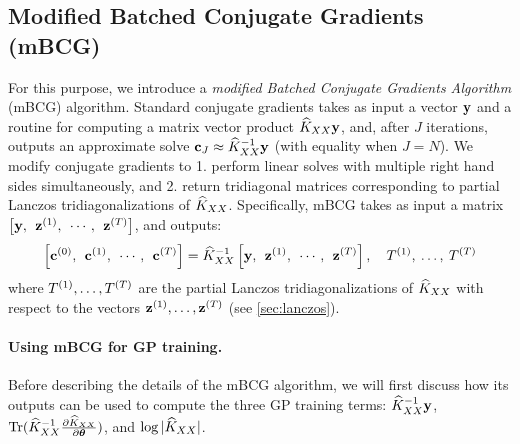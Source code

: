\subsection{Modified Batched Conjugate Gradients (mBCG)}
\label{sec:mbcg}

For this purpose, we introduce a \emph{modified Batched Conjugate Gradients Algorithm} (mBCG) algorithm.
Standard conjugate gradients takes as input a vector $\mathbf{y}$ and a routine for computing a matrix vector product $\widehat{K}_{XX}\mathbf{y}$, and, after $J$ iterations, outputs an approximate solve $\mathbf{c}_{J} \approx \widehat{K}_{XX}^{-1}\mathbf{y}$ (with equality when $J = N$).
We modify conjugate gradients to 1. perform linear solves with multiple right hand sides simultaneously, and 2. return tridiagonal matrices corresponding to partial Lanczos tridiagonalizations of $\widehat{K}_{XX}$.
Specifically, mBCG takes as input a matrix $\left[ \mathbf{y}, \:\: \mathbf{z}^{(1)}, \:\: \cdots, \:\: \mathbf{z}^{(T)} \right]$, and outputs:
\begin{equation}
  \label{eqn:mod_cg_call}
  \left[ \mathbf{c}^{(0)}, \:\: \mathbf{c}^{(1)}, \:\: \cdots, \:\: \mathbf{c}^{(T)} \right] = \widehat{K}_{XX}^{-1} \left[ \mathbf{y}, \:\: \mathbf{z}^{(1)}, \:\: \cdots, \:\: \mathbf{z}^{(T)} \right], \quad T^{(1)}, \: \ldots, \: T^{(T)}
\end{equation}
where $T^{(1)}, \ldots, T^{(T)}$ are the partial Lanczos tridiagonalizations of $\widehat{K}_{XX}$ with respect to the vectors $\mathbf{z}^{(1)}, \ldots, \mathbf{z}^{(T)}$ (see \cref{sec:lanczos}).

\paragraph{Using mBCG for GP training.}
Before describing the details of the mBCG algorithm, we will first discuss how its outputs can be used to compute the three GP training terms:
$\widehat{K}_{XX}^{-1} \mathbf{y}$, $\tr{ \trainK^{-1} \frac{\partial \trainK}{\partial \btheta} }$, and $\log \vert \widehat{K}_{XX} \vert$.

